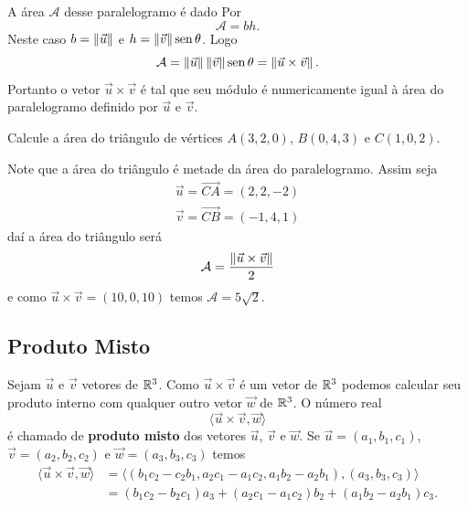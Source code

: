 A área $\mathcal{A}$ desse paralelogramo é dado Por
\[
    \mathcal{A} = bh.
\]
Neste caso $b = \left\Vert{\vec{u}}\right\Vert$ e $h = \left\Vert{\vec{v}}\right\Vert{\rm sen\,}\theta$. Logo
\[
    \mathcal{A} = \left\Vert{\vec{u}}\right\Vert\left\Vert{\vec{v}}\right\Vert{\rm sen\,}\theta = \left\Vert{\vec{u}\times\vec{v}}\right\Vert.
\]
Portanto o vetor $\vec{u}\times\vec{v}$ é tal que seu módulo é numericamente igual \`a área do paralelogramo definido por $\vec{u}$ e $\vec{v}$.
\begin{exemplo}
    Calcule a área do triângulo de vértices $A(3,2,0)$, $B(0,4,3)$ e $C(1,0,2)$.
    \begin{solucao}
        Note que a área do triângulo é metade da área do paralelogramo. Assim seja
        \begin{align*}
            \vec{u} = \vec{CA} = (2,2,-2) \\
            \vec{v} = \vec{CB} = (-1,4,1)
        \end{align*}
        daí a área do triângulo será
        \[
            \mathcal{A} = \dfrac{\left\Vert{\vec{u}\times\vec{v}}\right\Vert}{2}
        \]
        e como $\vec{u}\times\vec{v} = (10,0,10)$ temos $\mathcal{A} = 5\sqrt{2}$.
    \end{solucao}
\end{exemplo}

\subsection{Produto Misto}

Sejam $\vec{u}$ e $\vec{v}$ vetores de $\mathbb{R}^3$. Como $\vec{u}\times\vec{v}$ é um vetor de $\mathbb{R}^3$ podemos calcular seu produto interno com qualquer outro vetor $\vec{w}$ de $\mathbb{R}^3$. O número real
\begin{equation}
    \langle\vec{u}\times\vec{v}, \vec{w}\rangle
\end{equation}
é chamado de \textbf{produto misto} dos vetores $\vec{u}$, $\vec{v}$ e $\vec{w}$. Se $\vec{u} = (a_1,b_1,c_1)$, $\vec{v} =(a_2,b_2,c_2)$ e $\vec{w} = (a_3,b_3,c_3)$ temos
\begin{align*}
    \langle\vec{u}\times\vec{v}, \vec{w}\rangle & = \langle(b_1c_2 - c_2b_1,a_2c_1 - a_1c_2, a_1b_2 - a_2b_1), (a_3, b_3, c_3)\rangle \\ &= (b_1c_2 - b_2c_1)a_3 + (a_2c_1 - a_1c_2)b_2 + (a_1b_2 - a_2b_1)c_3.
\end{align*}

